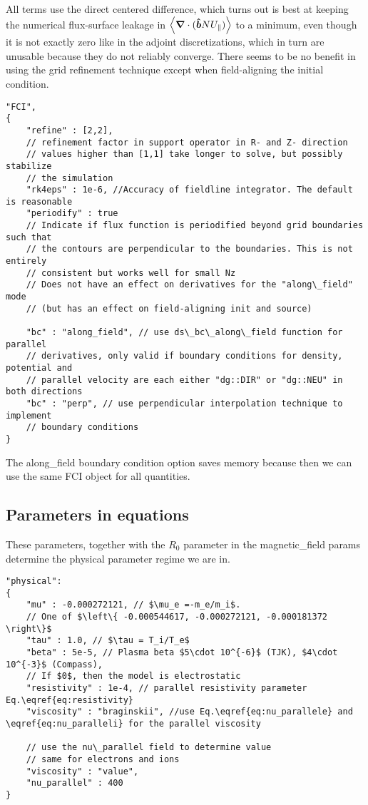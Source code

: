 All terms use the direct centered difference, which turns out is best
at keeping the numerical flux-surface leakage in $\left \langle {\boldsymbol{\nabla}}\cdot ( \bm{\hat{b}} NU_\parallel) \right \rangle$ to a minimum, even
though it is not exactly zero like in the adjoint discretizations, which in turn are unusable because they do not reliably converge.
There seems to be no benefit in using the grid refinement technique except when field-aligning the initial condition.
\begin{verbatim}
"FCI",
{
    "refine" : [2,2],
    // refinement factor in support operator in R- and Z- direction
    // values higher than [1,1] take longer to solve, but possibly stabilize
    // the simulation
    "rk4eps" : 1e-6, //Accuracy of fieldline integrator. The default is reasonable
    "periodify" : true
    // Indicate if flux function is periodified beyond grid boundaries such that
    // the contours are perpendicular to the boundaries. This is not entirely
    // consistent but works well for small Nz
    // Does not have an effect on derivatives for the "along\_field" mode
    // (but has an effect on field-aligning init and source)

    "bc" : "along_field", // use ds\_bc\_along\_field function for parallel
    // derivatives, only valid if boundary conditions for density, potential and
    // parallel velocity are each either "dg::DIR" or "dg::NEU" in both directions
    "bc" : "perp", // use perpendicular interpolation technique to implement
    // boundary conditions
}
\end{verbatim}

\begin{tcolorbox}[title=Note]
The along\_field boundary condition option saves memory because then we can use
the same FCI object for all quantities.
\end{tcolorbox}


\subsection{Parameters in equations}
These parameters, together with the $R_0$ parameter in the magnetic\_field params
determine the physical parameter regime we are in.
\begin{verbatim}
"physical":
{
    "mu" : -0.000272121, // $\mu_e =-m_e/m_i$.
    // One of $\left\{ -0.000544617, -0.000272121, -0.000181372 \right\}$
    "tau" : 1.0, // $\tau = T_i/T_e$
    "beta" : 5e-5, // Plasma beta $5\cdot 10^{-6}$ (TJK), $4\cdot 10^{-3}$ (Compass),
    // If $0$, then the model is electrostatic
    "resistivity" : 1e-4, // parallel resistivity parameter Eq.\eqref{eq:resistivity}
    "viscosity" : "braginskii", //use Eq.\eqref{eq:nu_parallele} and \eqref{eq:nu_paralleli} for the parallel viscosity

    // use the nu\_parallel field to determine value
    // same for electrons and ions
    "viscosity" : "value",
    "nu_parallel" : 400
}
\end{verbatim}
